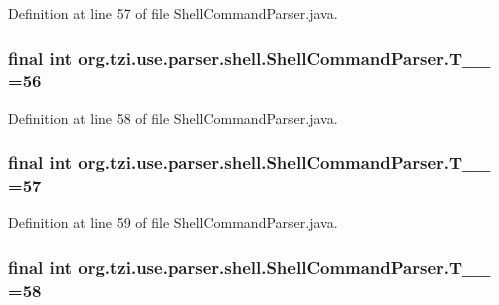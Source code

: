 Definition at line 57 of file Shell\-Command\-Parser.\-java.

\hypertarget{classorg_1_1tzi_1_1use_1_1parser_1_1shell_1_1_shell_command_parser_abf745a1c03a3e769593673c3f62442ef}{
\subsubsection[{T\-\_\-\-\_\-56}]{\setlength{\rightskip}{0pt plus 5cm}final int org.\-tzi.\-use.\-parser.\-shell.\-Shell\-Command\-Parser.\-T\-\_\-\-\_ =56\hspace{0.3cm}{\ttfamily [static]}}}\label{classorg_1_1tzi_1_1use_1_1parser_1_1shell_1_1_shell_command_parser_abf745a1c03a3e769593673c3f62442ef}


Definition at line 58 of file Shell\-Command\-Parser.\-java.

\hypertarget{classorg_1_1tzi_1_1use_1_1parser_1_1shell_1_1_shell_command_parser_a4a12379abae7761279d816d4e0a0d99d}{
\subsubsection[{T\-\_\-\-\_\-57}]{\setlength{\rightskip}{0pt plus 5cm}final int org.\-tzi.\-use.\-parser.\-shell.\-Shell\-Command\-Parser.\-T\-\_\-\-\_ =57\hspace{0.3cm}{\ttfamily [static]}}}\label{classorg_1_1tzi_1_1use_1_1parser_1_1shell_1_1_shell_command_parser_a4a12379abae7761279d816d4e0a0d99d}


Definition at line 59 of file Shell\-Command\-Parser.\-java.

\hypertarget{classorg_1_1tzi_1_1use_1_1parser_1_1shell_1_1_shell_command_parser_a0333f6440009b9b58382894010237c38}{
\subsubsection[{T\-\_\-\-\_\-58}]{\setlength{\rightskip}{0pt plus 5cm}final int org.\-tzi.\-use.\-parser.\-shell.\-Shell\-Command\-Parser.\-T\-\_\-\-\_ =58\hspace{0.3cm}{\ttfamily [static]}}}\label{classorg_1_1tzi_1_1use_1_1parser_1_1shell_1_1_shell_command_parser_a0333f6440009b9b58382894010237c38}


